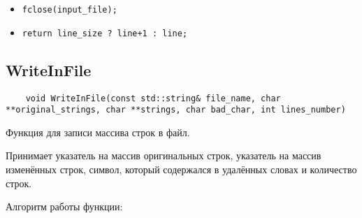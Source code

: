 \begin{itemize}
\begin{itemize}
\begin{itemize}
				\end{itemize}
			\item \verb|strcat(strings[line], current_char);|
			\item Если \verb|current_char == '\n'|
				\begin{itemize}
					\item \verb|strcat(strings[line], '\0');|
					\item \verb|line_size -= line_size;|
					\item \verb|++line;|
					\item Если \verb|line % lines_chunk_len == 0|
					\subitem \verb|strings = |\\
					\verb|(char**)realloc(strings, sizeof(char*) *|\\
					\verb|(line + lines_chunk_len));|
					\item \verb|strings[line] = (char*)calloc(string_chunk_len, sizeof(char));|
				\end{itemize}
		\end{itemize}
    \item \verb|fclose(input_file);|
    \item \verb|return line_size ? line+1 : line;|
\end{itemize}

\subsection*{WriteInFile}

\begin{lstlisting}
	void WriteInFile(const std::string& file_name, char **original_strings, char **strings, char bad_char, int lines_number)
\end{lstlisting}

Функция для записи массива строк в файл.

Принимает указатель на массив оригинальных строк, 
указатель на массив изменённых строк, символ, 
который содержался в удалённых словах и количество строк.

Алгоритм работы функции:

